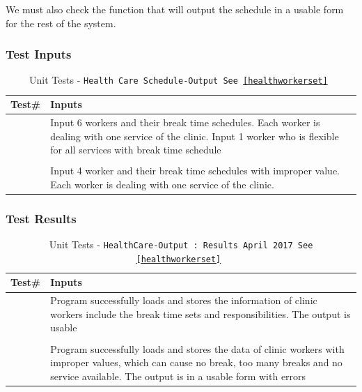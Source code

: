 \documentclass[12pt]{article}
\newcounter{TestCounter}
\newcounter{ResultCounter}
\begin{document}
	
		We must also check the function that will output the
		schedule in a usable form for the rest of the system.
		
			\subsubsection{Test Inputs}
			\begin{center}
				\begin{longtable}{c>{\raggedright\arraybackslash}p{8.8cm} }
					\caption{Unit Tests - \texttt{Health Care Schedule-Output See \ref{healthworkerset} }}\label{HealthCareOutput_unit}\\
					\toprule
					\bf Test\# & \bf Inputs \\\midrule
					{TestCounter}\arabic{TestCounter}
					& Input 6 workers and their break time schedules. Each worker is dealing with one service of the clinic. Input 1 worker who is flexible for all services with break time schedule\\
					\\\midrule
					{TestCounter}\arabic{TestCounter}
					& Input 4 worker and their break time schedules with improper value. Each worker is dealing with one service of the clinic. \\
					\bottomrule
				\end{longtable}
			\end{center}
			
			\subsubsection{Test Results}
			\begin{center}
				\begin{longtable}{c>{\raggedright\arraybackslash}p{8.8cm} }
					\caption{Unit Tests - \texttt{HealthCare-Output : Results April 2017 See \ref{healthworkerset} }}\label{HealthCareOutput_unit_results}\\
					\toprule
					\bf Test\# & \bf Inputs \\\midrule
					{ResultCounter}\arabic{ResultCounter}
					& Program successfully loads and stores the information of clinic workers include the break time sets and responsibilities. The output is usable\\
					\\\midrule
					{ResultCounter}\arabic{ResultCounter}
					& Program successfully loads and stores the data of clinic workers with improper values, which can cause no break, too many breaks and no service available. The output is in a usable form with errors   \\
					\bottomrule
				\end{longtable}
			\end{center}
		
\end{document}
